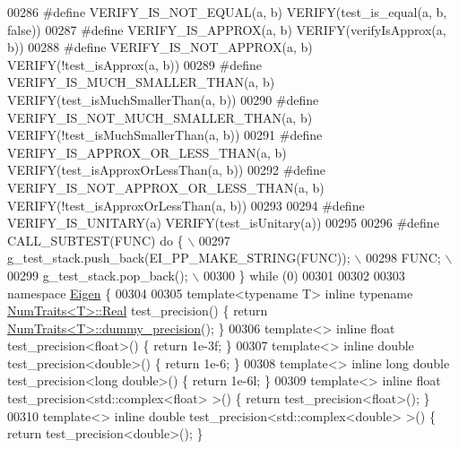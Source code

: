 \begin{DoxyCode}
00286 \textcolor{preprocessor}{#define VERIFY\_IS\_NOT\_EQUAL(a, b) VERIFY(test\_is\_equal(a, b, false))}
00287 \textcolor{preprocessor}{#define VERIFY\_IS\_APPROX(a, b) VERIFY(verifyIsApprox(a, b))}
00288 \textcolor{preprocessor}{#define VERIFY\_IS\_NOT\_APPROX(a, b) VERIFY(!test\_isApprox(a, b))}
00289 \textcolor{preprocessor}{#define VERIFY\_IS\_MUCH\_SMALLER\_THAN(a, b) VERIFY(test\_isMuchSmallerThan(a, b))}
00290 \textcolor{preprocessor}{#define VERIFY\_IS\_NOT\_MUCH\_SMALLER\_THAN(a, b) VERIFY(!test\_isMuchSmallerThan(a, b))}
00291 \textcolor{preprocessor}{#define VERIFY\_IS\_APPROX\_OR\_LESS\_THAN(a, b) VERIFY(test\_isApproxOrLessThan(a, b))}
00292 \textcolor{preprocessor}{#define VERIFY\_IS\_NOT\_APPROX\_OR\_LESS\_THAN(a, b) VERIFY(!test\_isApproxOrLessThan(a, b))}
00293 
00294 \textcolor{preprocessor}{#define VERIFY\_IS\_UNITARY(a) VERIFY(test\_isUnitary(a))}
00295 
00296 \textcolor{preprocessor}{#define CALL\_SUBTEST(FUNC) do \{ \(\backslash\)}
00297 \textcolor{preprocessor}{    g\_test\_stack.push\_back(EI\_PP\_MAKE\_STRING(FUNC)); \(\backslash\)}
00298 \textcolor{preprocessor}{    FUNC; \(\backslash\)}
00299 \textcolor{preprocessor}{    g\_test\_stack.pop\_back(); \(\backslash\)}
00300 \textcolor{preprocessor}{  \} while (0)}
00301 
00302 
00303 \textcolor{keyword}{namespace }\hyperlink{namespace_eigen}{Eigen} \{
00304 
00305 \textcolor{keyword}{template}<\textcolor{keyword}{typename} T> \textcolor{keyword}{inline} \textcolor{keyword}{typename} \hyperlink{group___core___module_struct_eigen_1_1_num_traits}{NumTraits<T>::Real} test\_precision() \{ \textcolor{keywordflow}{return} 
      \hyperlink{group___core___module_struct_eigen_1_1_num_traits}{NumTraits<T>::dummy\_precision}(); \}
00306 \textcolor{keyword}{template}<> \textcolor{keyword}{inline} \textcolor{keywordtype}{float} test\_precision<float>() \{ \textcolor{keywordflow}{return} 1e-3f; \}
00307 \textcolor{keyword}{template}<> \textcolor{keyword}{inline} \textcolor{keywordtype}{double} test\_precision<double>() \{ \textcolor{keywordflow}{return} 1e-6; \}
00308 \textcolor{keyword}{template}<> \textcolor{keyword}{inline} \textcolor{keywordtype}{long} \textcolor{keywordtype}{double} test\_precision<long double>() \{ \textcolor{keywordflow}{return} 1e-6l; \}
00309 \textcolor{keyword}{template}<> \textcolor{keyword}{inline} \textcolor{keywordtype}{float} test\_precision<std::complex<float> >() \{ \textcolor{keywordflow}{return} test\_precision<float>(); \}
00310 \textcolor{keyword}{template}<> \textcolor{keyword}{inline} \textcolor{keywordtype}{double} test\_precision<std::complex<double> >() \{ \textcolor{keywordflow}{return} test\_precision<double>(); \}

\end{DoxyCode}
